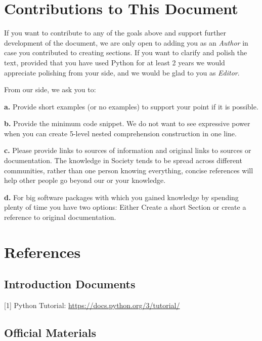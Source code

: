 \documentclass[
]{article}
\begin{document}
\hypertarget{contributions-to-this-document}{%
\section{Contributions to This
Document}\label{contributions-to-this-document}}

If you want to contribute to any of the goals above and support further
development of the document, we are only open to adding you as an
\emph{Author} in case you contributed to creating sections. If you want
to clarify and polish the text, provided that you have used Python for
at least 2 years we would appreciate polishing from your side, and we
would be glad to you as \emph{Editor}.

From our side, we ask you to:

\textbf{a.} Provide short examples (or no examples) to support your
point if it is possible.

\textbf{b.} Provide the minimum code snippet. We do not want to see
expressive power when you can create 5-level nested comprehension
construction in one line.

\textbf{c.} Please provide links to sources of information and original
links to sources or documentation. The knowledge in Society tends to be
spread across different communities, rather than one person knowing
everything, concise references will help other people go beyond our or
your knowledge.

\textbf{d.} For big software packages with which you gained knowledge by
spending plenty of time you have two options: Either Create a short
Section or create a reference to original documentation.

\hypertarget{references}{%
\section{References}\label{references}}

\hypertarget{introduction-documents}{%
\subsection{Introduction Documents}\label{introduction-documents}}

{[}1{]} Python Tutorial: \url{https://docs.python.org/3/tutorial/}

\hypertarget{official-materials}{%
\subsection{Official Materials}\label{official-materials}}
\end{document}
